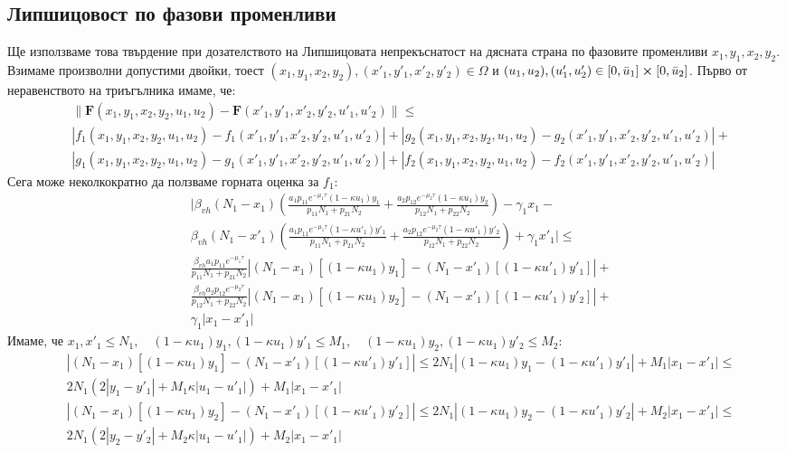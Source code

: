 \subsection{Липшицовост по фазови променливи}
Ще използваме това твърдение при дозателството на Липшицовата непрекъснатост на дясната страна по фазовите променливи $x_1, y_1, x_2, y_2$. Взимаме произволни допустими двойки, тоест $(x_1, y_1, x_2, y_2), (x'_1, y'_1, x'_2, y'_2) \in \Omega$ и $(u_1, u_2), (u'_1, u'_2) \in [0, \bar{u}_1] \cross [0, \bar{u}_2]$.
Първо от неравенството на триъгълника имаме, че:
\begin{align*}
  &\|\mathbf{F}(x_1, y_1, x_2, y_2, u_1, u_2) - \mathbf{F}(x'_1, y'_1, x'_2, y'_2, u'_1, u'_2)\| \leq \\
  &|f_1(x_1, y_1, x_2, y_2, u_1, u_2) - f_1(x'_1, y'_1, x'_2, y'_2, u'_1, u'_2)| + |g_2(x_1, y_1, x_2, y_2, u_1, u_2) - g_2(x'_1, y'_1, x'_2, y'_2, u'_1, u'_2)| + \\
  &|g_1(x_1, y_1, x_2, y_2, u_1, u_2) - g_1(x'_1, y'_1, x'_2, y'_2, u'_1, u'_2)| + |f_2(x_1, y_1, x_2, y_2, u_1, u_2) - f_2(x'_1, y'_1, x'_2, y'_2, u'_1, u'_2)|
\end{align*}
Сега може неколкократно да ползваме горната оценка за $f_1$:
\begin{align*}
  &\bigg|\beta_{vh} (N_1-x_1) \left(\frac{a_1 p_{11} e^{-\mu_1 \tau} (1-\kappa u_1) y_1}{p_{11} N_1 + p_{21} N_2} + \frac{a_2 p_{12} e^{-\mu_2 \tau} (1-\kappa u_1) y_2}{p_{12} N_1 + p_{22} N_2 }\right) - \gamma_1 x_1 - \\
  &\beta_{vh} (N_1-x'_1) \left(\frac{a_1 p_{11} e^{-\mu_1 \tau} (1-\kappa u'_1) y'_1}{p_{11} N_1 + p_{21} N_2} + \frac{a_2 p_{12} e^{-\mu_2 \tau} (1-\kappa u'_1) y'_2}{p_{12} N_1 + p_{22} N_2 }\right) + \gamma_1 x'_1\bigg| \leq \\
  &\frac{\beta_{vh} a_1 p_{11} e^{-\mu_1 \tau}}{p_{11} N_1 + p_{21} N_2} \left|(N_1-x_1) [(1-\kappa u_1) y_1] - (N_1-x'_1) [(1-\kappa u'_1) y'_1]\right| + \\
  &\frac{\beta_{vh} a_2 p_{12} e^{-\mu_2 \tau}}{p_{12} N_1 + p_{22} N_2} \left|(N_1-x_1) [(1-\kappa u_1) y_2] - (N_1-x'_1) [(1-\kappa u'_1) y'_2]\right| + \\
  &\gamma_1 |x_1-x'_1|
\end{align*}
Имаме, че $x_1, x'_1 \leq N_1, \quad (1-\kappa u_1)y_1, (1-\kappa u_1) y'_1 \leq M_1, \quad (1-\kappa u_1)y_2, (1-\kappa u_1) y'_2 \leq M_2$:
\begin{align*}
  &\left|(N_1-x_1) [(1-\kappa u_1) y_1] - (N_1-x'_1) [(1-\kappa u'_1) y'_1]\right| \leq 2 N_1 |(1-\kappa u_1) y_1 - (1-\kappa u'_1) y'_1| + M_1 |x_1 - x'_1| \leq \\
  &2 N_1 (2|y_1 - y'_1| + M_1 \kappa |u_1 - u'_1|) + M_1 |x_1 - x'_1| \\
  &\left|(N_1-x_1) [(1-\kappa u_1) y_2] - (N_1-x'_1) [(1-\kappa u'_1) y'_2]\right| \leq 2 N_1 |(1-\kappa u_1) y_2 - (1-\kappa u'_1) y'_2| + M_2 |x_1 - x'_1| \leq \\
  &2 N_1 (2|y_2 - y'_2| + M_2 \kappa |u_1 - u'_1|) + M_2 |x_1 - x'_1|
\end{align*}
